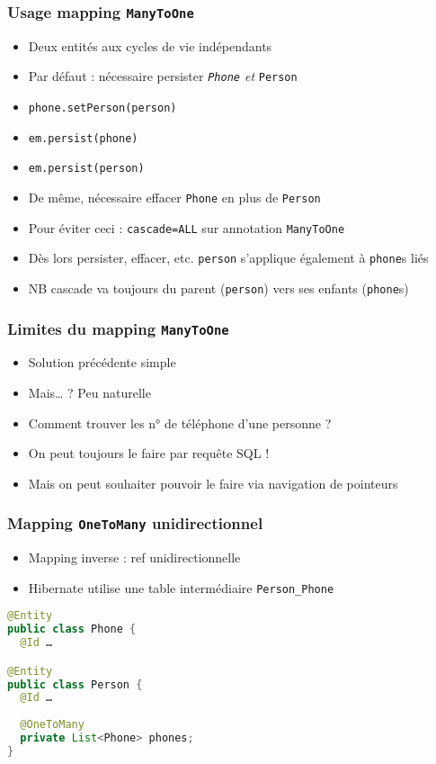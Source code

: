 \documentclass[english, french]{beamer}
\begin{document}
\begin{frame}
	\frametitle{Usage mapping \texttt{ManyToOne}}
	\begin{itemize}
		\item Deux entités aux cycles de vie indépendants
		\item Par défaut : nécessaire persister \emph{\texttt{Phone} et} \texttt{Person}
		\item \texttt{phone.setPerson(person)}
		\item \texttt{em.persist(phone)}
		\item \texttt{em.persist(person)}
		\item De même, nécessaire effacer \texttt{Phone} en plus de \texttt{Person}
		\item Pour éviter ceci : \texttt{cascade=ALL} sur annotation \texttt{ManyToOne}
		\item Dès lors persister, effacer, etc. \texttt{person} s’applique également à \texttt{phone}s liés
		\item NB cascade va toujours du parent (\texttt{person}) vers ses enfants (\texttt{phone}s)
	\end{itemize}
\end{frame}

\begin{frame}
	\frametitle{Limites du mapping \texttt{ManyToOne}}
	\begin{itemize}
		\item Solution précédente simple
		\item Mais… ? \pause Peu naturelle \pause
		\item Comment trouver les n° de téléphone d’une personne ? \pause
		\item On peut toujours le faire par requête SQL !
		\item Mais on peut souhaiter pouvoir le faire via navigation de pointeurs
	\end{itemize}
\end{frame}

\begin{frame}[fragile]
	\frametitle{Mapping \texttt{OneToMany} unidirectionnel}
	\begin{itemize}
		\item Mapping inverse : ref  unidirectionnelle
		\item Hibernate utilise une table intermédiaire \texttt{Person\_Phone}%
	\end{itemize}
	\begin{lstlisting}[language=Java]
@Entity
public class Phone {
  @Id …

@Entity
public class Person {
  @Id …
  
  @OneToMany
  private List<Phone> phones;
}
	\end{lstlisting}
\end{frame}
\end{document}
